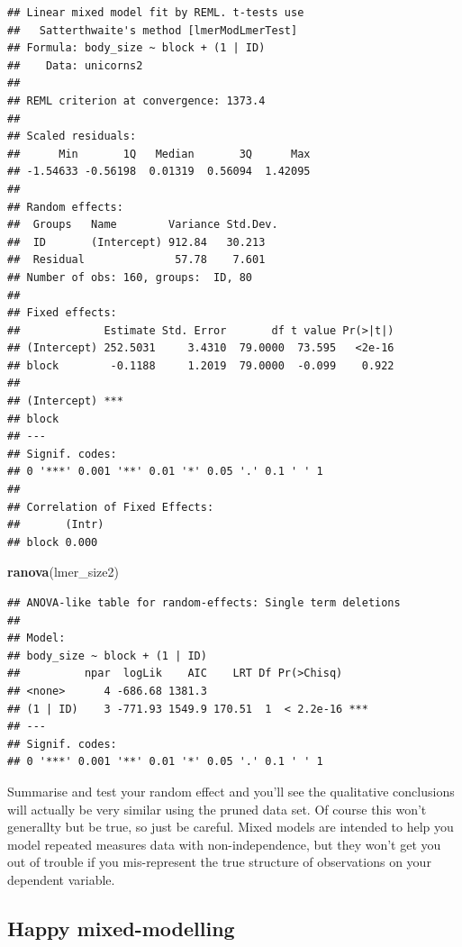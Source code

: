 \documentclass[
  12pt,
]{book}
\newenvironment{Shaded}{\begin{snugshade}}{\end{snugshade}}
\newcommand{\KeywordTok}[1]{\textcolor[rgb]{0.13,0.29,0.53}{\textbf{#1}}}
\newcommand{\NormalTok}[1]{#1}
\begin{document}
\begin{verbatim}
## Linear mixed model fit by REML. t-tests use
##   Satterthwaite's method [lmerModLmerTest]
## Formula: body_size ~ block + (1 | ID)
##    Data: unicorns2
## 
## REML criterion at convergence: 1373.4
## 
## Scaled residuals: 
##      Min       1Q   Median       3Q      Max 
## -1.54633 -0.56198  0.01319  0.56094  1.42095 
## 
## Random effects:
##  Groups   Name        Variance Std.Dev.
##  ID       (Intercept) 912.84   30.213  
##  Residual              57.78    7.601  
## Number of obs: 160, groups:  ID, 80
## 
## Fixed effects:
##             Estimate Std. Error       df t value Pr(>|t|)
## (Intercept) 252.5031     3.4310  79.0000  73.595   <2e-16
## block        -0.1188     1.2019  79.0000  -0.099    0.922
##                
## (Intercept) ***
## block          
## ---
## Signif. codes:  
## 0 '***' 0.001 '**' 0.01 '*' 0.05 '.' 0.1 ' ' 1
## 
## Correlation of Fixed Effects:
##       (Intr)
## block 0.000
\end{verbatim}

\begin{Shaded}
\begin{Highlighting}[]
\KeywordTok{ranova}\NormalTok{(lmer\_size2)}
\end{Highlighting}
\end{Shaded}

\begin{verbatim}
## ANOVA-like table for random-effects: Single term deletions
## 
## Model:
## body_size ~ block + (1 | ID)
##          npar  logLik    AIC    LRT Df Pr(>Chisq)    
## <none>      4 -686.68 1381.3                         
## (1 | ID)    3 -771.93 1549.9 170.51  1  < 2.2e-16 ***
## ---
## Signif. codes:  
## 0 '***' 0.001 '**' 0.01 '*' 0.05 '.' 0.1 ' ' 1
\end{verbatim}

Summarise and test your random effect and you'll see the qualitative conclusions will actually be very similar using the pruned data set. Of course this won't generallty but be true, so just be careful. Mixed models are intended to help you model repeated measures data with non-independence, but they won't get you out of trouble if you mis-represent the true structure of observations on your dependent variable.

\hypertarget{happy-mixed-modelling}{%
\subsection{Happy mixed-modelling}\label{happy-mixed-modelling}}
\end{document}

